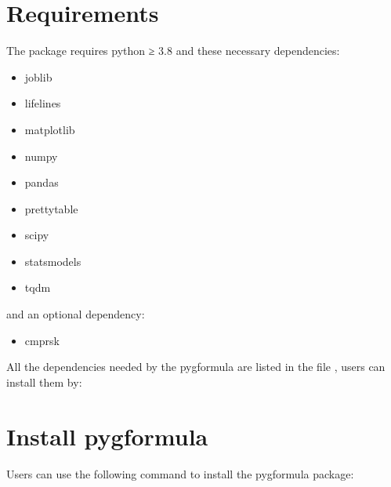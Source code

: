 \documentclass[letterpaper,10pt,english]{sphinxmanual}
\begin{document}
\section{Requirements}
\label{\detokenize{Installation:requirements}}
\sphinxAtStartPar
The package requires python ≥ 3.8 and these necessary dependencies:
\begin{itemize}
\item {} 
\sphinxAtStartPar
joblib

\item {} 
\sphinxAtStartPar
lifelines

\item {} 
\sphinxAtStartPar
matplotlib

\item {} 
\sphinxAtStartPar
numpy

\item {} 
\sphinxAtStartPar
pandas

\item {} 
\sphinxAtStartPar
prettytable

\item {} 
\sphinxAtStartPar
scipy

\item {} 
\sphinxAtStartPar
statsmodels

\item {} 
\sphinxAtStartPar
tqdm

\end{itemize}

\sphinxAtStartPar
and an optional dependency:
\begin{itemize}
\item {} 
\sphinxAtStartPar
cmprsk

\end{itemize}

\sphinxAtStartPar
All the dependencies needed by the pygformula are listed in the file
 , users can
install them by:

\begin{sphinxVerbatim}[commandchars=\\\{\}]
   
\end{sphinxVerbatim}


\section{Install pygformula}
\label{\detokenize{Installation:install-pygformula}}
\sphinxAtStartPar
Users can use the following command to install the pygformula package:
\end{document}

